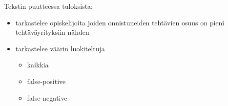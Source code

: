 Tekstin puutteessa tuloksista:
\begin{itemize}
    \item tarkastelee opiskelijoita joiden onnistuneiden tehtävien osuus on pieni tehtäväyrityksiin nähden
    \item tarkastelee väärin luokiteltuja
    \begin{itemize}
        \item kaikkia
        \item false-positive
        \item false-negative
    \end{itemize}
\end{itemize}